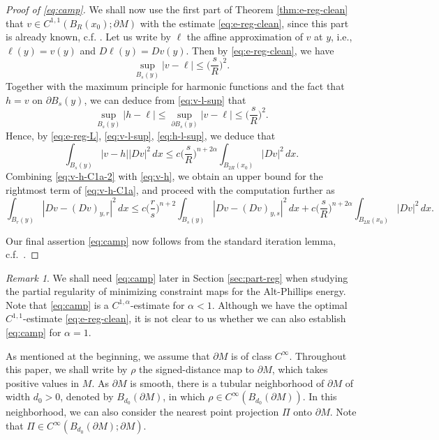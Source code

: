 \documentclass[11pt]{amsart}
\newcommand\bblue[1]{{\color{blue} #1}}
\theoremstyle{plain}
\theoremstyle{definition}
\theoremstyle{remark}
\newtheorem{rem}[thm]{Remark}
\numberwithin{equation}{section}
\begin{document}
\begin{proof}[Proof of \eqref{eq:camp}]
    We shall now use the first part of Theorem \ref{thm:e-reg-clean} that $v\in C^{1,1}(B_R(x_0);\partial M)$ with the estimate \eqref{eq:e-reg-clean}, since this part is already known, c.f. \cite[Theorem 2.4]{FGKS2}.
Let us write by $\ell$ the affine approximation of $v$ at $y$, i.e., $\ell(y) = v(y)$ and $D\ell (y) = Dv(y)$. Then by \eqref{eq:e-reg-clean}, we have 
    \begin{equation}
        \label{eq:v-l-sup}
        \sup_{B_s(y)} |v-\ell| \leq \bigg(\frac{s}{R}\bigg)^2. 
    \end{equation}
    Together with the maximum principle for harmonic functions and the fact that $h = v$ on $\partial B_s(y)$, we can deduce from \eqref{eq:v-l-sup} that
    \begin{equation}
        \label{eq:h-l-sup}
        \sup_{B_s(y)} |h-\ell| \leq \sup_{\partial B_s(y)} |v-\ell| \leq \bigg(\frac{s}{R}\bigg)^2. 
    \end{equation}
    Hence, by \eqref{eq:e-reg-L}, \eqref{eq:v-l-sup}, \eqref{eq:h-l-sup}, we deduce that 
    \begin{equation}
        \label{eq:v-h}
        \int_{B_s(y)} |v-h||Dv|^2\,dx \leq c\bigg(\frac{s}{R}\bigg)^{n+2\alpha} \int_{B_{2R}(x_0)} |Dv|^2\,dx. 
    \end{equation}
    Combining \eqref{eq:v-h-C1a-2} with \eqref{eq:v-h}, we obtain an upper bound for the rightmost term of \eqref{eq:v-h-C1a}, and proceed with the computation further as 
    $$
    \int_{B_r(y)} |Dv-(Dv)_{y,r}|^2\,dx \leq c\bigg(\frac{r}{s}\bigg)^{n+2}\int_{B_s(y)} |Dv - (Dv)_{y,s}|^2\,dx + c\bigg(\frac{s}{R}\bigg)^{n+2\alpha}\int_{B_{2R}(x_0)}|Dv|^2\,dx. 
    $$

    Our final assertion \eqref{eq:camp} now follows from the standard iteration lemma, c.f.\ \cite[Lemma 2.2]{GG}.

\end{proof}


\begin{rem}
    \label{rem:e-reg-clean}
    We shall need \eqref{eq:camp} later in Section \ref{sec:part-reg} when studying the partial regularity of minimizing constraint maps for the Alt-Phillips energy. Note that \eqref{eq:camp} is a $C^{1,\alpha}$-estimate for $\alpha < 1$. Although we have the optimal $C^{1,1}$-estimate \eqref{eq:e-reg-clean}, it is not clear to us whether we can also establish \eqref{eq:camp} for $\alpha = 1$. 
\end{rem}
As mentioned at the beginning, we assume that $\partial M$ is of class $C^\infty$. 
Throughout this paper, we shall write by $\rho$ the signed-distance map to $\partial M$, which takes positive values in $M$. As $\partial M$ is smooth, there is a tubular neighborhood of $\partial M$ of width $d_0 > 0$, denoted by $B_{d_0}(\partial M)$, in which $\rho \in C^\infty(B_{d_0}(\partial M))$. In this neighborhood, we can also consider the nearest point projection $\Pi$ onto $\partial M$. Note that $\Pi\in C^\infty({B_{d_0}(\partial M)};\partial M)$.
\end{document}
